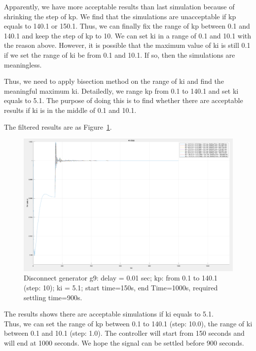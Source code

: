 Apparently, we have more acceptable results than last simulation because of shrinking the step of kp. We find that the simulations are unacceptable if kp equals to 140.1 or 150.1. Thus, we can finally fix the range of kp between 0.1 and 140.1 and keep the step of kp to 10. We can set ki in a range of 0.1 and 10.1 with the reason above. However, it is possible that the maximum value of ki is still 0.1 if we set the range of ki be from 0.1 and 10.1. If so, then the simulations are meaningless.  

Thus, we need to apply bisection method on the range of ki and find the meaningful maximum ki. Detailedly, we range kp from 0.1 to 140.1 and set ki equals to 5.1. The purpose of doing this is to find whether there are acceptable results if ki is in the middle of 0.1 and 10.1.

The filtered results are as Figure~\ref{4_1_2_c}.  

\begin{figure}[htbp]
\centering
\includegraphics[width = .819\textwidth]{figure/4_1_2_c.png}
\caption{Disconnect generator g9: delay = 0.01 sec; kp: from 0.1 to 140.1 (step: 10); ki = 5.1; start time=150s, end Time=1000s, required settling time=900s.}
\label{4_1_2_c}
\end{figure}

The results shows there are acceptable simulations if ki equals to 5.1. \\

Thus, we can set the range of kp between 0.1 to 140.1 (step: 10.0), the range of ki between 0.1 and 10.1 (step: 1.0). The controller will start from 150 seconds and will end at 1000 seconds. We hope the signal can be settled before 900 seconds.
